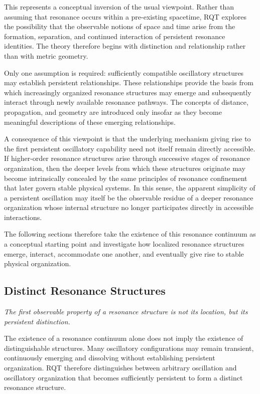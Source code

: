 \documentclass[11pt,a4paper]{article}
\begin{document}
This represents a conceptual inversion of the usual viewpoint. Rather than assuming that resonance occurs within a pre-existing spacetime, RQT explores the possibility that the observable notions of space and time arise from the formation, separation, and continued interaction of persistent resonance identities. The theory therefore begins with distinction and relationship rather than with metric geometry.

Only one assumption is required: sufficiently compatible oscillatory structures may establish persistent relationships. These relationships provide the basis from which increasingly organized resonance structures may emerge and subsequently interact through newly available resonance pathways. The concepts of distance, propagation, and geometry are introduced only insofar as they become meaningful descriptions of these emerging relationships.

A consequence of this viewpoint is that the underlying mechanism giving rise to the first persistent oscillatory capability need not itself remain directly accessible. If higher-order resonance structures arise through successive stages of resonance organization, then the deeper levels from which these structures originate may become intrinsically concealed by the same principles of resonance confinement that later govern stable physical systems. In this sense, the apparent simplicity of a persistent oscillation may itself be the observable residue of a deeper resonance organization whose internal structure no longer participates directly in accessible interactions.

The following sections therefore take the existence of this resonance continuum as a conceptual starting point and investigate how localized resonance structures emerge, interact, accommodate one another, and eventually give rise to stable physical organization.

\subsection{Distinct Resonance Structures}

\emph{The first observable property of a resonance structure is not its location, but its persistent distinction.}
\vspace{0.6em} 

The existence of a resonance continuum alone does not imply the existence of distinguishable structures. Many oscillatory configurations may remain transient, continuously emerging and dissolving without establishing persistent organization. RQT therefore distinguishes between arbitrary oscillation and oscillatory organization that becomes sufficiently persistent to form a distinct resonance structure.
\end{document}
